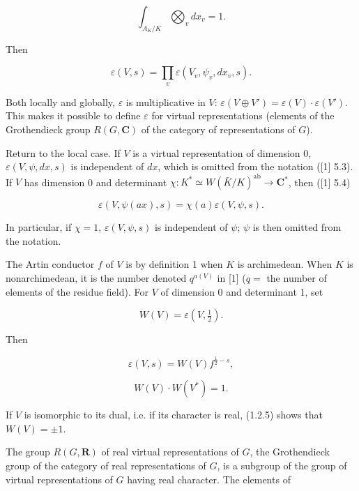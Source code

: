 \documentclass[9pt,twoside]{extarticle}
\begin{document}
{\[
\int_{A_K/K}\bigotimes_v dx_v=1.
\]

Then\par

\[
\tag{1.2.1} \varepsilon(V,s)=\prod_v\varepsilon(V_v,\psi_v,dx_v,s).
\]

Both locally and globally, \(\varepsilon\) is multiplicative in \(V\): \(\varepsilon(V\oplus V')=\varepsilon(V)\cdot\varepsilon(V')\). This makes it possible to define \(\varepsilon\) for virtual representations (elements of the Grothendieck group \(R(G,\mathbf C)\) of the category of representations of \(G\)).\par

Return to the local case. If \(V\) is a virtual representation of dimension 0, \(\varepsilon(V,\psi,dx,s)\) is independent of \(dx\), which is omitted from the notation ([1] 5.3). If \(V\) has dimension 0 and determinant \(\chi:K^*\simeq W(\bar K/K)^{\mathrm{ab}}\to\mathbf C^*\), then ([1] 5.4)\par

\[
\tag{1.2.2} \varepsilon(V,\psi(ax),s)=\chi(a)\varepsilon(V,\psi,s).
\]

In particular, if \(\chi=1\), \(\varepsilon(V,\psi,s)\) is independent of \(\psi\); \(\psi\) is then omitted from the notation.\par

The Artin conductor \(f\) of \(V\) is by definition 1 when \(K\) is archimedean. When \(K\) is nonarchimedean, it is the number denoted \(q^{a(V)}\) in [1] (\(q=\) the number of elements of the residue field). For \(V\) of dimension 0 and determinant 1, set\par

\[
\tag{1.2.3} W(V)=\varepsilon\!\left(V,\tfrac12\right).
\]

Then\par

\[
\tag{1.2.4} \varepsilon(V,s)=W(V)f^{\frac12-s},
\]

\[
\tag{1.2.5} W(V)\cdot W(V^*)=1.
\]

If \(V\) is isomorphic to its dual, i.e. if its character is real, (1.2.5) shows that \(W(V)=\pm1\).\par

The group \(R(G,\mathbf R)\) of real virtual representations of \(G\), the Grothendieck group of the category of real representations of \(G\), is a subgroup of the group of virtual representations of \(G\) having real character. The elements of\par
}
\end{document}
